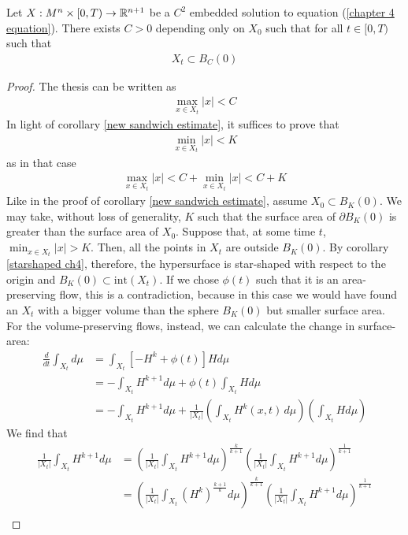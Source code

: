 \begin{proposition}
	Let $X:M^n\times [0,T) \rightarrow \mathbb{R}^{n+1}$ be a $C^2$ embedded solution to equation (\ref{chapter 4 equation}). There exists $C>0$ depending only on $X_0$ such that for all $t\in[0, T)$ such that 
	\begin{align*}
		X_t \subset B_C(0)
	\end{align*}
\end{proposition}
\begin{proof}
	The thesis can be written as 
	\begin{align*}
		\max_{x\in X_t} |x| < C
	\end{align*}
	In light of corollary \ref{new sandwich estimate}, it suffices to prove that 
	\begin{align*}
		\min_{x\in X_t} |x| < K
	\end{align*}
	as in that case 
	\begin{align*}
		\max_{x\in X_t} |x| < C + \min_{x\in X_t} |x| < C+K
	\end{align*}
	Like in the proof of corollary \ref{new sandwich estimate}, assume $X_0\subset B_K(0)$. We may take, without loss of generality, $K$ such that the surface area of $\partial B_K(0)$ is greater than the surface area of $X_0$. 
	Suppose that, at some time $t$, $\min_{x\in X_t} |x| > K$. Then, all the points in $X_t$ are outside $B_K(0)$.  By corollary \ref{starshaped ch4}, therefore, the hypersurface is star-shaped with respect to the origin and $B_K(0)\subset \mathrm{int}(X_t)$. If we chose $\phi(t)$ such that it is an area-preserving flow, this is a contradiction, because in this case we would have found an $X_t$ with a bigger volume than the sphere $B_K(0)$ but smaller surface area. For the volume-preserving flows, instead, we can calculate the change in surface-area: 
	\begin{align*}
		\frac{d}{d t}\int_{X_t} d\mu &=  \int_{X_t}  \left[- H^k + \phi(t)\right] H d\mu \\
		&= - \int_{X_t}  H^{k+1} d\mu  + \phi(t)\int_{X_t} H d\mu\\
		&= - \int_{X_t}  H^{k+1} d\mu  + \frac{1}{|X_t|}\left(\int_{X_t} H^k(x, t) \, d\mu\right)\left(\int_{X_t} H d\mu\right)
	\end{align*}
	We find that 
	\begin{align*}
		\frac{1}{|X_t|}\int_{X_t}  H^{k+1} d\mu &=\left(\frac{1}{|X_t|}\int_{X_t}  H^{k+1} d\mu\right)^{\frac{k}{k+1}}\left(\frac{1}{|X_t|}\int_{X_t}  H^{k+1} d\mu\right)^{\frac{1}{k+1}}\\ &=\left(\frac{1}{|X_t|}\int_{X_t}  \left(H^{k}\right)^{\frac{k+1}{k}} d\mu\right)^{\frac{k}{k+1}}  \left(\frac{1}{|X_t|}\int_{X_t}  H^{k+1} d\mu\right)^{\frac{1}{k+1}}\\

\end{align*}
\end{proof}
